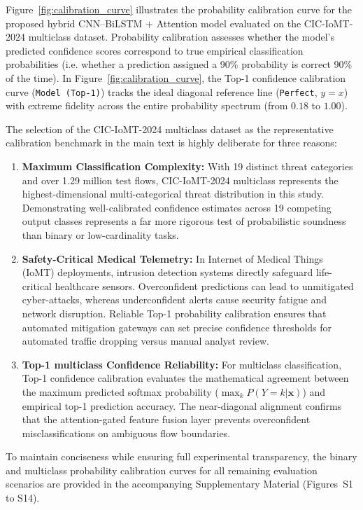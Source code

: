 \documentclass[a4paper,fleqn]{cas-sc}
\begin{document}
Figure~\ref{fig:calibration_curve} illustrates the probability calibration curve for the proposed hybrid CNN--BiLSTM + Attention model evaluated on the CIC-IoMT-2024 multiclass dataset. Probability calibration assesses whether the model's predicted confidence scores correspond to true empirical classification probabilities (i.e. whether a prediction assigned a 90\% probability is correct 90\% of the time). In Figure~\ref{fig:calibration_curve}, the Top-1 confidence calibration curve (\texttt{Model (Top-1)}) tracks the ideal diagonal reference line (\texttt{Perfect}, $y=x$) with extreme fidelity across the entire probability spectrum (from $0.18$ to $1.00$).

The selection of the CIC-IoMT-2024 multiclass dataset as the representative calibration benchmark in the main text is highly deliberate for three reasons:
\begin{enumerate}
    \item \textbf{Maximum Classification Complexity:} With 19 distinct threat categories and over 1.29 million test flows, CIC-IoMT-2024 multiclass represents the highest-dimensional multi-categorical threat distribution in this study. Demonstrating well-calibrated confidence estimates across 19 competing output classes represents a far more rigorous test of probabilistic soundness than binary or low-cardinality tasks.
    \item \textbf{Safety-Critical Medical Telemetry:} In Internet of Medical Things (IoMT) deployments, intrusion detection systems directly safeguard life-critical healthcare sensors. Overconfident predictions can lead to unmitigated cyber-attacks, whereas underconfident alerts cause security fatigue and network disruption. Reliable Top-1 probability calibration ensures that automated mitigation gateways can set precise confidence thresholds for automated traffic dropping versus manual analyst review.
    \item \textbf{Top-1 multiclass Confidence Reliability:} For multiclass classification, Top-1 confidence calibration evaluates the mathematical agreement between the maximum predicted softmax probability ($\max_k P(Y=k|\mathbf{x})$) and empirical top-1 prediction accuracy. The near-diagonal alignment confirms that the attention-gated feature fusion layer prevents overconfident misclassifications on ambiguous flow boundaries.
\end{enumerate}

To maintain conciseness while ensuring full experimental transparency, the binary and multiclass probability calibration curves for all remaining evaluation scenarios are provided in the accompanying Supplementary Material (Figures~S1 to S14).
\end{document}
